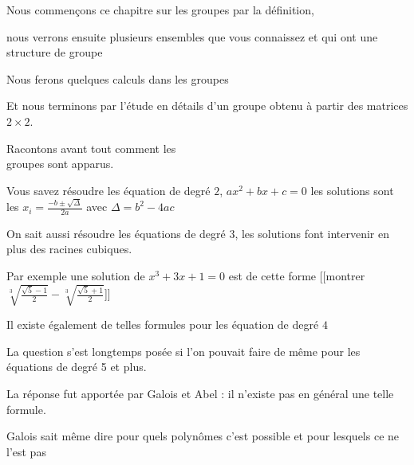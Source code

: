 







\debuttexte

\diapo

\change

\change

Nous commençons ce chapitre sur les groupes par la définition,

\change 

nous verrons ensuite plusieurs ensembles
que vous connaissez et qui ont une structure de groupe

\change

Nous ferons quelques calculs dans les groupes

\change

Et nous terminons par l'étude en détails
d'un groupe obtenu à partir des matrices $2 \times 2$.


\diapo

Racontons avant tout comment les\\ groupes sont apparus.

Vous savez résoudre les équation de degré $2$, $ax^2+bx+c=0$
les solutions sont les $x_i = \frac{-b\pm\sqrt{\Delta}}{2a}$
avec $\Delta = b^2-4ac$

\change

On sait aussi résoudre les équations de degré $3$, les solutions font
intervenir en plus des racines cubiques.

Par exemple une solution de $x^3+3x+1=0$ 
est de cette forme [[montrer $\sqrt[3]{\frac{\sqrt 5 - 1}{2}} -  \sqrt[3]{\frac{\sqrt 5 + 1}{2}}$]]


\change

Il existe également de telles formules pour les équation de degré $4$

\change

La question s'est longtemps posée si l'on pouvait faire de même
pour les équations de degré 5 et plus.

\change

La réponse fut apportée par Galois et Abel : il n'existe pas en général une telle  formule.

Galois sait même dire pour quels polynômes c'est possible
et pour lesquels ce ne l'est pas



